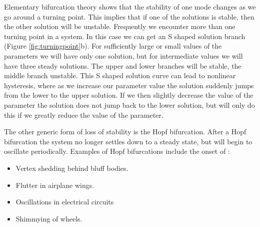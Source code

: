 Elementary bifurcation theory shows that the stability of 
one mode changes as we go around a turning point.  This implies
that if one of the solutions is stable, then the  other solution 
will be unstable.  Frequently we encounter more than one
turning point in a system.  In this case we can get an \textsf{S} shaped 
solution branch (Figure \ref{fig:turningpoint}b).   For sufficiently large or small values of the
parameters we will have only one solution, but for intermediate
values we will have three steady solutions.  The upper and
lower branches will be stable, the middle branch unstable.  
This \textsf{S} shaped solution curve can lead to nonlinear
hysteresis, where as we increase our parameter value
the solution suddenly jumps from the lower to the upper
solution. If we then slightly decrease the value of the
parameter the solution does not jump back to the lower solution,
but will only do this if we greatly reduce the value of 
the parameter.  

The other generic form of loss of stability is the
 Hopf bifurcation.   After  a Hopf bifurcation  the system 
no longer settles down to a steady state, but will begin to
oscillate periodically.  Examples of Hopf bifurcations include
the onset of :

\begin{itemize}
\item  Vertex shedding behind bluff bodies.
\item  Flutter in airplane wings.
\item   Oscillations in electrical circuits 
\item  Shimmying of wheels.
\end{itemize}

